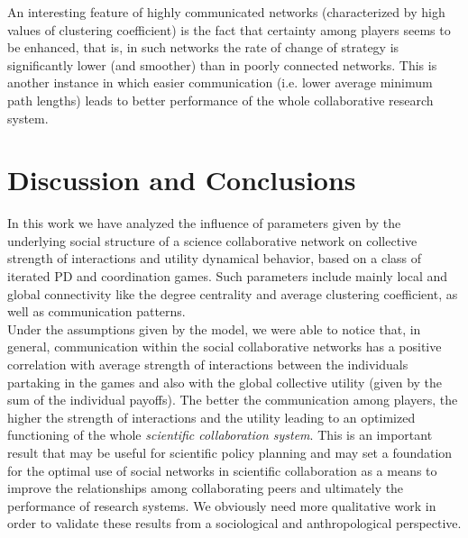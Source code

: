 \documentclass[11pt]{article}
\begin{document}
\FloatBarrier

An interesting feature of highly communicated networks (characterized
by high values of clustering coefficient) is the fact that certainty
among players seems to be enhanced, that is, in such networks the rate
of change of strategy is significantly lower (and smoother) than in
poorly connected networks. This is another instance in which easier
communication (i.e. lower average minimum path lengths) leads to better
performance of the whole collaborative research system.\\


\section{Discussion and Conclusions}
\label{sec:3}

In this work we have analyzed the influence of parameters
  given by the underlying social structure of a science collaborative
  network on collective strength of interactions and utility dynamical
  behavior, based on a class of iterated PD and coordination
  games. Such parameters include mainly local and global connectivity
  like the degree centrality and average clustering coefficient, as
  well as communication patterns.\\

  Under the assumptions given by the model, we were able to
  notice that, in general, communication within the social
  collaborative networks has a positive correlation with average
  strength of interactions between the individuals partaking in the
  games and also with the global collective utility (given by the sum
  of the individual payoffs). The better the communication among
  players, the higher the strength of interactions and the utility
  leading to an optimized functioning of the whole \emph{scientific
    collaboration system}. This is an important result that may be
  useful for scientific policy planning and may set a foundation for
  the optimal use of social networks in scientific collaboration as a
  means to improve the relationships among collaborating peers and
  ultimately the performance of research systems.  We obviously need
  more qualitative work in order to validate these results from a
  sociological and anthropological perspective.\\

\end{document}

